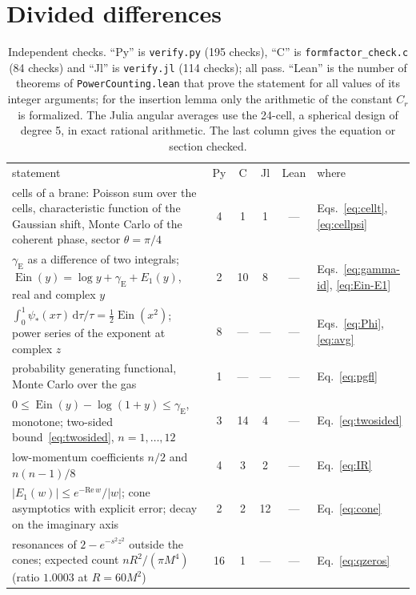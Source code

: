\documentclass[aps,prd,10pt,twocolumn,superscriptaddress,nofootinbib,floatfix,longbibliography]{revtex4-2}
\newcommand{\dd}{\mathrm{d}}
\newcommand{\Ein}{\operatorname{Ein}}
\newcommand{\gE}{\gamma_{\mathrm E}}
\begin{document}
\section{Divided differences}
\label{app:dd}

\begin{table}[t]
\caption{Independent checks. ``Py'' is \texttt{verify.py} (195 checks), ``C'' is \texttt{formfactor\_check.c} (84 checks) and ``Jl'' is \texttt{verify.jl} (114 checks); all pass. ``Lean'' is the number of theorems of \texttt{PowerCounting.lean} that prove the statement for all values of its integer arguments; for the insertion lemma only the arithmetic of the constant $C_r$ is formalized. The Julia angular averages use the 24-cell, a spherical design of degree 5, in exact rational arithmetic. The last column gives the equation or section checked.}
\label{tab:checks}
\begin{ruledtabular}
\setlength{\tabcolsep}{4pt}
\begin{tabular}{p{10.6cm}ccccl}
statement & Py & C & Jl & Lean & where\\
\colrule
cells of a brane: Poisson sum over the cells, characteristic function of the Gaussian shift, Monte Carlo of the coherent phase, sector $\theta=\pi/4$ & 4 & 1 & 1 & --- & Eqs.~\eqref{eq:cellt}, \eqref{eq:cellpsi}\\
$\gE$ as a difference of two integrals; $\Ein(y)=\log y+\gE+E_1(y)$, real and complex $y$ & 2 & 10 & 8 & --- & Eqs.~\eqref{eq:gamma-id}, \eqref{eq:Ein-E1}\\
$\int_0^1\psi_*(x\tau)\,\dd\tau/\tau=\frac12\Ein(x^2)$; power series of the exponent at complex $z$ & 8 & --- & --- & --- & Eqs.~\eqref{eq:Phi}, \eqref{eq:avg}\\
probability generating functional, Monte Carlo over the gas & 1 & --- & --- & --- & Eq.~\eqref{eq:pgfl}\\
$0\le\Ein(y)-\log(1+y)\le\gE$, monotone; two-sided bound~\eqref{eq:twosided}, $n=1,\dots,12$ & 3 & 14 & 4 & --- & Eq.~\eqref{eq:twosided}\\
low-momentum coefficients $n/2$ and $n(n-1)/8$ & 4 & 3 & 2 & --- & Eq.~\eqref{eq:IR}\\
$|E_1(w)|\le e^{-\mathrm{Re}\,w}/|w|$; cone asymptotics with explicit error; decay on the imaginary axis & 2 & 2 & 12 & --- & Eq.~\eqref{eq:cone}\\
resonances of $2-e^{-s^2z^2}$ outside the cones; expected count $nR^2/(\pi M^4)$ (ratio $1.0003$ at $R=60M^2$) & 16 & 1 & --- & --- & Eq.~\eqref{eq:qzeros}\\

\end{tabular}
\end{ruledtabular}
\end{table}
\end{document}
